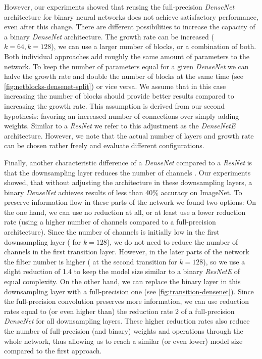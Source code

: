 \documentclass[10pt,twocolumn,letterpaper]{article}
\newcommand{\architecture}[1]{\emph{#1}}
\newcommand{\arch}[1]{\emph{#1}}
\begin{document}
However, our experiments showed that reusing the full-precision \architecture{DenseNet} architecture for binary neural networks does not achieve satisfactory performance, even after this change.
There are different possibilities to increase the capacity of a binary \architecture{DenseNet} architecture.
The growth rate can be increased (\eg$k=64, k=128$), we can use a larger number of blocks, or a combination of both.
Both individual approaches add roughly the same amount of parameters to the network.
To keep the number of parameters equal for a given \architecture{DenseNet} we can halve the growth rate and double the number of blocks at the same time (see \autoref{fig:netblocks-densenet-split}) or vice versa.
We assume that in this case increasing the number of blocks should provide better results compared to increasing the growth rate.
This assumption is derived from our second hypothesis: favoring an increased number of connections over simply adding weights.
Similar to a \arch{ResNet} we refer to this adjustment as the \architecture{DenseNetE} architecture.
However, we note that the actual number of layers and growth rate can be chosen rather freely and evaluate different configurations.

Finally, another characteristic difference of a \arch{DenseNet} compared to a \arch{ResNet} is that the downsampling layer reduces the number of channels \cite{Huang2016}.
Our experiments showed, that without adjusting the architecture in these downsampling layers, a binary \architecture{DenseNet} achieves results of less than 40\% accuracy on ImageNet.
To preserve information flow in these parts of the network we found two options:
On the one hand, we can use no reduction at all, or at least use a lower reduction rate (using a higher number of channels compared to a full-precision architecture).
Since the number of channels is initially low in the first downsampling layer ( for $k=128$), we do not need to reduce the number of channels in the first transition layer.
However, in the later parts of the network the filter number is higher ( at the second transition for $k=128$), so we use a slight reduction of 1.4 to keep the model size similar to a binary \architecture{ResNetE} of equal complexity.
On the other hand, we can replace the binary layer in this downsampling layer with a full-precision one (see \autoref{fig:transition-densenet}).
Since the full-precision convolution preserves more information, we can use reduction rates equal to (or even higher than) the reduction rate 2 of a full-precision \arch{DenseNet} for all downsampling layers.
These higher reduction rates also reduce the number of full-precision (and binary) weights and operations through the whole network, thus allowing us to reach a similar (or even lower) model size compared to the first approach.
\end{document}
